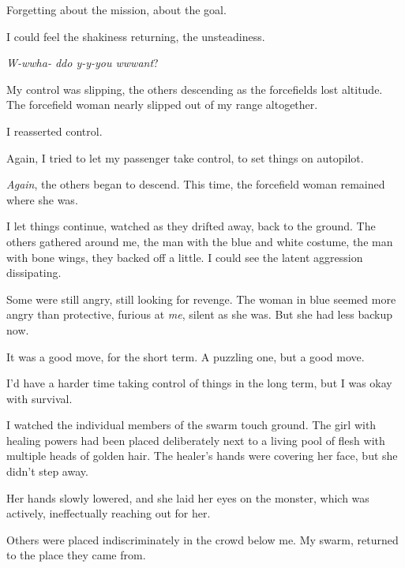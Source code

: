 Forgetting about the mission, about the goal.



I could feel the shakiness returning, the unsteadiness.



\emph{W-wwha- ddo y-y-you wwwant}?



My control was slipping, the others descending as the forcefields lost altitude.  The forcefield woman nearly slipped out of my range altogether.



I reasserted control.



Again, I tried to let my passenger take control, to set things on autopilot.



\emph{Again}, the others began to descend.  This time, the forcefield woman remained where she was.



I let things continue, watched as they drifted away, back to the ground.  The others gathered around me, the man with the blue and white costume, the man with bone wings, they backed off a little.  I could see the latent aggression dissipating.



Some were still angry, still looking for revenge.  The woman in blue seemed more angry than protective, furious at \emph{me}, silent as she was.  But she had less backup now.



It was a good move, for the short term.  A puzzling one, but a good move.



I'd have a harder time taking control of things in the long term, but I was okay with survival.



I watched the individual members of the swarm touch ground.  The girl with healing powers had been placed deliberately next to a living pool of flesh with multiple heads of golden hair.  The healer's hands were covering her face, but she didn't step away.



Her hands slowly lowered, and she laid her eyes on the monster, which was actively, ineffectually reaching out for her.



Others were placed indiscriminately in the crowd below me.  My swarm, returned to the place they came from.



